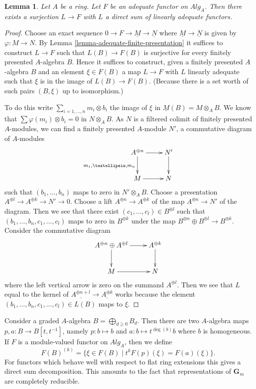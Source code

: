 \documentclass{stacks-project}
\theoremstyle{plain}
\newtheorem{lemma}[subsection]{Lemma}
\theoremstyle{definition}
\theoremstyle{remark}
\numberwithin{equation}{subsection}
\begin{document}
\begin{lemma}
\label{lemma-adequate-surjection-from-linear}
Let $A$ be a ring.
Let $F$ be an adequate functor on $\textit{Alg}_A$. Then there exists a
surjection $L \to F$ with $L$ a direct sum of linearly adequate functors.
\end{lemma}

\begin{proof}
Choose an exact sequence $0 \to F \to \underline{M} \to \underline{N}$
where $\underline{M} \to \underline{N}$ is given by
$\varphi : M \to N$. By
Lemma \ref{lemma-adequate-finite-presentation}
it suffices to construct $L \to F$ such that $L(B) \to F(B)$ is surjective
for every finitely presented $A$-algebra $B$. Hence it suffices to construct,
given a finitely presented $A$-algebra $B$ and an element $\xi \in F(B)$
a map $L \to F$ with $L$ linearly adequate such that $\xi$ is in the image
of $L(B) \to F(B)$.
(Because there is a set worth of such pairs $(B, \xi)$ up to isomorphism.)

\medskip\noindent
To do this write $\sum_{i = 1, \ldots, n} m_i \otimes b_i$ the image of
$\xi$ in $\underline{M}(B) = M \otimes_A B$. We know that
$\sum \varphi(m_i) \otimes b_i = 0$ in $N \otimes_A B$.
As $N$ is a filtered colimit of finitely presented $A$-modules, we can
find a finitely presented $A$-module $N'$, a commutative diagram
of $A$-modules
$$
\xymatrix{
A^{\oplus n} \ar[r] \ar[d]_{m_1, \ldots, m_n} & N' \ar[d] \\
M \ar[r] & N
}
$$
such that $(b_1, \ldots, b_n)$ maps to zero in $N' \otimes_A B$.
Choose a presentation $A^{\oplus l} \to A^{\oplus k} \to N' \to 0$.
Choose a lift $A^{\oplus n} \to A^{\oplus k}$ of the map
$A^{\oplus n} \to N'$ of the diagram. Then we see that there exist
$(c_1, \ldots, c_l) \in B^{\oplus l}$ such that
$(b_1, \ldots, b_n, c_1, \ldots, c_l)$ maps to zero in $B^{\oplus k}$
under the map $B^{\oplus n} \oplus B^{\oplus l} \to B^{\oplus k}$.
Consider the commutative diagram
$$
\xymatrix{
A^{\oplus n} \oplus A^{\oplus l} \ar[r] \ar[d] & A^{\oplus k} \ar[d] \\
M \ar[r] & N
}
$$
where the left vertical arrow is zero on the summand $A^{\oplus l}$.
Then we see that $L$ equal to the kernel of $\underline{A^{\oplus n + l}}
\to \underline{A^{\oplus k}}$ works because the element
$(b_1, \ldots, b_n, c_1, \ldots, c_l) \in L(B)$ maps to $\xi$.
\end{proof}

\noindent
Consider a graded $A$-algebra $B = \bigoplus_{d \geq 0} B_d$. Then there are
two $A$-algebra maps $p, a : B \to B[t, t^{-1}]$, namely $p : b \mapsto b$ and
$a : b \mapsto t^{\deg(b)} b$ where $b$ is homogeneous. If $F$ is a
module-valued functor on $\textit{Alg}_A$, then we define
\begin{equation}
\label{equation-weight-k}
F(B)^{(k)} = \{\xi \in F(B) \mid t^k F(p)(\xi) = F(a)(\xi)\}.
\end{equation}
For functors which behave well with respect to flat ring extensions
this gives a direct sum decomposition. This amounts to the fact that
representations of $\mathbf{G}_m$ are completely reducible.
\end{document}
